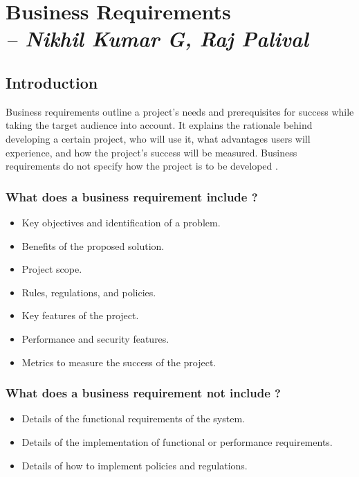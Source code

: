 \chapter{Business Requirements\\
\small{\textit{-- Nikhil Kumar G, Raj Palival}}
\label{Chapter::Business Requirements}}

\section{Introduction \label{Section::BusinessRequirementIntro}} 
Business requirements outline a project's needs and prerequisites for success while taking the target audience into account. It explains the rationale behind developing a certain project, who will use it, what advantages users will experience, and how the project's success will be measured. Business requirements do not specify how the project is to be developed \cite{businessRequirement}.
\subsection{What does a business requirement include ?\label{SubSection::BRInclusions}}
\begin{itemize}
    \item Key objectives and identification of a problem.
    \item Benefits of the proposed solution.
    \item Project scope.
    \item Rules, regulations, and policies.
    \item Key features of the project.
    \item Performance and security features.
    \item Metrics to measure the success of the project.
\end{itemize}
\subsection{What does a business requirement not include ?\label{SubSection::BRExclusions}}
\begin{itemize}
    \item Details of the functional requirements of the system.
    \item Details of the implementation of functional or performance requirements.
    \item Details of how to implement policies and regulations.
\end{itemize}
\newpage
